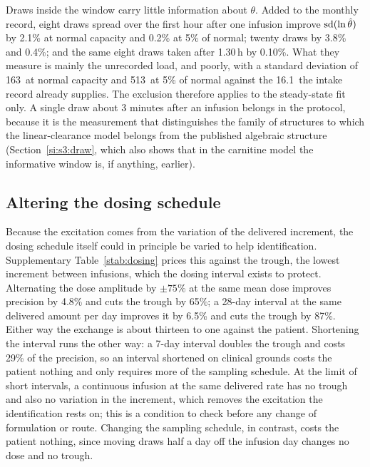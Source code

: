 Draws inside the window carry little information about $\theta$. Added to the monthly record,
eight draws spread over the first hour after one infusion improve $\operatorname{sd}(\ln \hat\theta)$ by 2.1\% at normal capacity and 0.2\% at
5\% of normal; twenty draws by 3.8\% and 0.4\%; and the same eight draws taken after 1.30\,h by
0.10\%. What they measure is mainly the unrecorded load, and poorly, with a standard deviation of
163\um\ at normal capacity and 513\um\ at 5\% of normal against the 16.1\um\ the intake record
already supplies. The exclusion therefore applies to the steady-state fit only. A single draw
about 3 minutes after an infusion belongs in the protocol, because it is the measurement that
distinguishes the family of structures to which the linear-clearance model belongs from the
published algebraic structure (Section~\ref{si:s3:draw}, which also shows that in the
carnitine model the informative window is, if anything, earlier).

\subsection{Altering the dosing schedule}
\label{si:s2:dosing}

Because the excitation comes from the variation of the delivered increment, the dosing schedule
itself could in principle be varied to help identification. Supplementary
Table~\ref{stab:dosing} prices this against the trough, the lowest increment between infusions,
which the dosing interval exists to protect. Alternating the dose amplitude by $\pm75\%$ at the
same mean dose improves precision by 4.8\% and cuts the trough by 65\%; a 28-day interval at the
same delivered amount per day improves it by 6.5\% and cuts the trough by 87\%. Either way the
exchange is about thirteen to one against the patient. Shortening the interval runs the other
way: a 7-day interval doubles the trough and costs 29\% of the precision, so an interval shortened
on clinical grounds costs the patient nothing and only requires more of the sampling schedule. At the
limit of short intervals, a continuous infusion at the same delivered rate has no trough and also
no variation in the increment, which removes the excitation the identification rests on; this is
a condition to check before any change of formulation or route. Changing the sampling schedule,
in contrast, costs the patient nothing, since moving draws half a day off the infusion day changes
no dose and no trough.

